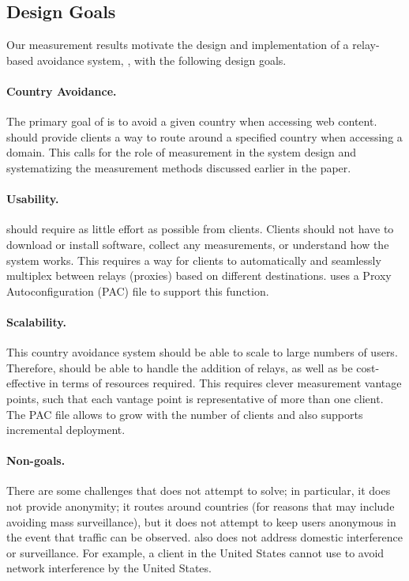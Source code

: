 \subsection{Design Goals}
\label{goals}

Our measurement results motivate 
 the design and implementation of a relay-based avoidance system,
\system{}, with the following design goals.

\paragraph{Country Avoidance.}  The primary goal of \system{} is to
avoid a given country when accessing web content.  \system{} should
provide clients a way to route around a specified country when
accessing a domain.  This calls for the role of measurement in the
system design and systematizing the measurement methods discussed
earlier in the paper.

\paragraph{Usability.} \system{} should require as little effort as
possible from clients.  Clients should not have to download
or install software, collect any measurements, or understand how the
system works.  This requires a way for clients to automatically and
seamlessly multiplex between relays (proxies) based on different
destinations.  \system{} uses a Proxy Autoconfiguration (PAC) file to support this
function.

\paragraph{Scalability.}  This country avoidance system should be able to scale to 
large numbers of users.  Therefore, \system{} should be able to handle the addition
 of relays, as well as be cost-effective in terms of resources required. This requires 
clever measurement vantage points, such that each vantage point is representative of 
more than one client.  The PAC file allows \system{} to 
grow with the number of clients and also supports incremental deployment.

\paragraph{Non-goals.}  There are some challenges that \system{} does not
attempt to  solve; in particular, it does not provide anonymity; it routes
around  countries (for reasons that may include avoiding mass surveillance),
but it does not attempt to keep users anonymous in the event that traffic can
be observed.   \system{} also does not address domestic interference or surveillance. For
example, a client in the United States cannot use \system{} to avoid network interference 
by the United States. 

